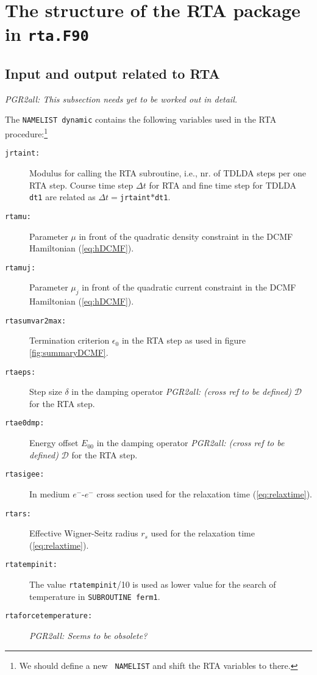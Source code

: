 \documentclass[final,1p]{elsarticle}
\newcommand{\PGRcomm}[1]{{\color{blue}\small\em PGR2all: #1}}
\newcommand{\PGRfoot}[1]{{\color{blue}\footnote{\color{blue} #1}}}
\begin{document}
\section{The structure of the RTA package in {\tt rta.F90}}
\label{eq:RTApack}

\subsection{Input and output related to RTA}
\label{sec:IO}

\PGRcomm{This subsection needs yet to be worked out in detail.}

\medskip

The {\tt NAMELIST dynamic} contains the following variables
used in the RTA procedure:\PGRfoot{We should define a new {\tt
    NAMELIST} and shift the RTA variables to there.}
\begin{description}
\item[\tt jrtaint:]
   Modulus for calling the RTA subroutine, i.e., nr. of TDLDA steps
   per one RTA step. Course time step $\Delta t$ for RTA and fine
   time step for TDLDA {\tt dt1} are related as
   $\Delta t=${\tt jrtaint}$*${\tt dt1}.
\item[\tt rtamu:]
   Parameter $\mu$ in front of the quadratic density constraint in the
   DCMF Hamiltonian (\ref{eq:hDCMF}).
\item[\tt rtamuj:]
   Parameter $\mu_j$ in front of the quadratic current constraint in the
   DCMF Hamiltonian (\ref{eq:hDCMF}).
\item[\tt rtasumvar2max:] Termination criterion $\epsilon_0$ in the
   RTA step as used
   in figure \ref{fig:summaryDCMF}. 
\item[\tt rtaeps:]
  Step size $\delta$ in the damping operator \PGRcomm{(cross ref to be
    defined)} $\mathcal{D}$ for the RTA step.
\item[\tt rtae0dmp:]
  Energy offset $E_00$ in the damping operator \PGRcomm{(cross ref to be
    defined)} $\mathcal{D}$ for the RTA step.
\item[\tt rtasigee:]
  In medium $e^-$-$e^-$ cross section used for the relaxation time 
  (\ref{eq:relaxtime}).
\item[\tt rtars:]
  Effective  Wigner-Seitz radius $r_s$ used for the relaxation time 
  (\ref{eq:relaxtime}).
\item[\tt rtatempinit:]
  The value {\tt rtatempinit}/10 is used as lower value for the search
  of temperature in {\tt SUBROUTINE ferm1}.
\item[\tt rtaforcetemperature:]
  \PGRcomm{Seems to be obsolete?}
\end{description}
\end{document}
